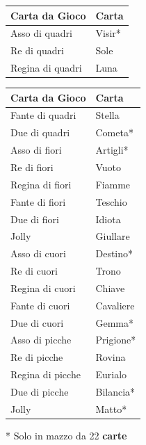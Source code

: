 \begin{multicols}{2}
\noindent\begin{tabularx}{\linewidth}{ll}
	\toprule
\rowcolor{gray!20}\textbf{Carta da Gioco} & \textbf{Carta}\\
\toprule
	Asso di quadri & Visir* \\
 \rowcolor{gray!20}Re di quadri & Sole \\
	Regina di quadri & Luna \\
	\end{tabularx}
\noindent\begin{tabularx}{\linewidth}{ll}
	\toprule
\rowcolor{gray!20}\textbf{Carta da Gioco} & \textbf{Carta}\\
	\toprule
	Fante di quadri & Stella \\
 \rowcolor{gray!20}Due di quadri & Cometa* \\
	Asso di fiori & Artigli* \\
 \rowcolor{gray!20}Re di fiori & Vuoto \\
	Regina di fiori & Fiamme \\
 \rowcolor{gray!20}Fante di fiori & Teschio \\
	Due di fiori & Idiota \\
 \rowcolor{gray!20}Jolly & Giullare \\
	Asso di cuori & Destino* \\
 \rowcolor{gray!20}Re di cuori & Trono \\
	Regina di cuori & Chiave \\
 \rowcolor{gray!20}Fante di cuori & Cavaliere \\
	Due di cuori & Gemma* \\
 \rowcolor{gray!20}Asso di picche & Prigione* \\
	Re di picche & Rovina \\
 \rowcolor{gray!20}Regina di picche & Eurialo \\
	Due di picche & Bilancia* \\
 \rowcolor{gray!20}Jolly & Matto* \\
	\end{tabularx}

\medskip

* Solo in mazzo da 22 \textbf{carte}


\end{multicols}
